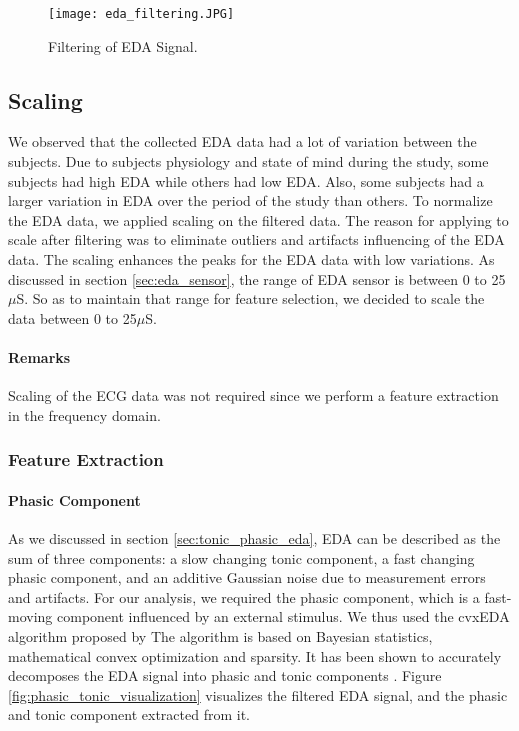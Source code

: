 \begin{figure}
    \centering
    \texttt{[image: eda\_filtering.JPG]}
    \caption{Filtering of EDA Signal.}
    \label{fig:eda_filtering_}
\end{figure}

\subsection{Scaling}
\label{sec:eda_scaling}
We observed that the collected EDA data had a lot of variation between the subjects. Due to subjects physiology and state of mind during the study, some subjects had high EDA while others had low EDA. Also, some subjects had a larger variation in EDA over the period of the study than others. To normalize the EDA data, we applied scaling on the filtered data. The reason for applying to scale after filtering was to eliminate outliers and artifacts influencing of the EDA data. The scaling enhances the peaks for the EDA data with low variations. As discussed in section \ref{sec:eda_sensor}, the range of EDA sensor is between 0 to 25$\mu$S. So as to maintain that range for feature selection, we decided to scale the data between 0 to 25$\mu$S.

\paragraph{Remarks} Scaling of the ECG data was not required since we perform a feature extraction in the frequency domain.

\subsubsection{Feature Extraction}
\label{sec:eda_fet_ext}
\paragraph{Phasic Component} As we discussed in section \ref{sec:tonic_phasic_eda}, EDA can be described as the sum of three components: a slow changing tonic component, a fast changing phasic component, and an additive Gaussian noise due to measurement errors and artifacts. For our analysis, we required the phasic component, which is a fast-moving component influenced by an external stimulus. We thus used the cvxEDA algorithm proposed by \citeauthor{greco_cvxeda:_2016}\cite{greco_cvxeda:_2016} The algorithm is based on Bayesian statistics, mathematical convex optimization and sparsity. It has been shown to accurately decomposes the EDA signal into phasic and tonic components \cite{greco_cvxeda:_2016}. Figure \ref{fig:phasic_tonic_visualization} visualizes the filtered EDA signal, and the phasic and tonic component extracted from it. 

